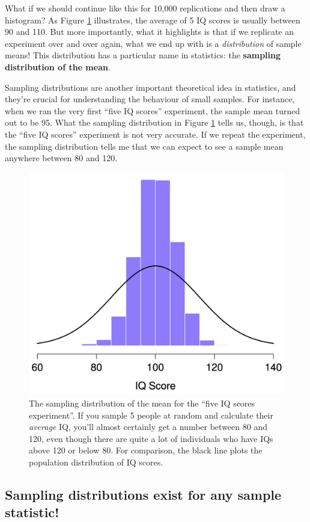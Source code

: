 \documentclass[
  11pt,
  a4paper,
  twoside,symmetric,openright]{book}
\theoremstyle{break}
\theoremstyle{break}
\begin{document}
What if we should continue like this for 10,000 replications and then draw a histogram? As Figure \ref{fig:sampdistmean} illustrates, the average of 5 IQ scores is usually between 90 and 110. But more importantly, what it highlights is that if we replicate an experiment over and over again, what we end up with is a \emph{distribution} of sample means! This distribution has a particular name in statistics: the \textbf{sampling distribution of the mean}.

Sampling distributions are another important theoretical idea in statistics, and they're crucial for understanding the behaviour of small samples. For instance, when we ran the very first ``five IQ scores'' experiment, the sample mean turned out to be 95. What the sampling distribution in Figure \ref{fig:sampdistmean} tells us, though, is that the ``five IQ scores'' experiment is not very accurate. If we repeat the experiment, the sampling distribution tells me that we can expect to see a sample mean anywhere between 80 and 120.



\begin{figure}

{\centering \includegraphics[width=0.6\linewidth]{resources/image/sampleDist4} 

}

\caption{The sampling distribution of the mean for the ``five IQ scores experiment''. If you sample 5 people at random and calculate their \emph{average} IQ, you'll almost certainly get a number between 80 and 120, even though there are quite a lot of individuals who have IQs above 120 or below 80. For comparison, the black line plots the population distribution of IQ scores.}\label{fig:sampdistmean}
\end{figure}

\subsection{Sampling distributions exist for any sample statistic!}\label{sampling-distributions-exist-for-any-sample-statistic}
\end{document}
